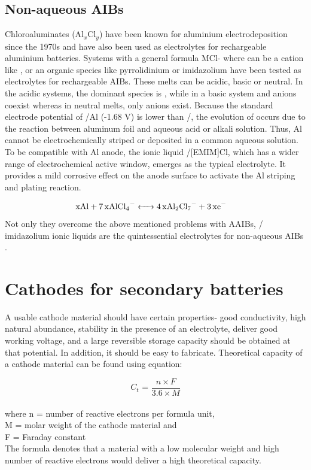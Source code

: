 \subsection{Non-aqueous AIBs}
Chloroaluminates (Al$_x$Cl$_y$) have been known for aluminium electrodeposition since the 1970s and have also been used as electrolytes for rechargeable aluminium batteries\cite{weppner,fung_reac}. Systems with a general formula MCl- where  can be a cation like ,  or an organic species like pyrrolidinium or imidazolium have been tested as electrolytes for rechargeable AIBs\cite{das_aluminium-ion_2017}. These melts can be acidic, basic or neutral. In the acidic systems, the dominant species is , while in a basic system  and  anions coexist whereas in neutral melts, only  anions exist. Because the standard electrode potential of /Al (-1.68 V) is lower than /, the evolution of  occurs due to the reaction between aluminum foil and aqueous acid or alkali solution. Thus, Al cannot be electrochemically striped or deposited in a common aqueous solution. To be compatible with Al anode, the ionic liquid /[EMIM]Cl, which has a wider range of electrochemical active window, emerges as the typical electrolyte. It provides a mild corrosive effect on the anode surface to activate the Al striping and plating reaction. 

\begin{align*}
        \ce{xAl + 7x\ce{AlCl4-} &<-> 4x\ce{Al2Cl7-} + 3x\ce{e-}}
\end{align*}
Not only they overcome the above mentioned problems with AAIBs, / imidazolium ionic liquids are the quintessential electrolytes for non-aqueous AIBs \cite{jayaprakash_rechargeable_2011, lin_ultrafast_2015-3,wang_new_2013-1,rani_fluorinated_2013}. 

\section{Cathodes for secondary batteries}
A usable cathode material should have certain properties- good conductivity, high natural abundance, stability in the presence of an electrolyte, deliver good working voltage, and a large reversible storage capacity should be obtained at that potential. In addition, it should be easy to fabricate. Theoretical capacity of a cathode material can be found using equation:

\begin{equation} \label{eq3}
   C_{t} \text{ = } \frac{n \times F}{3.6 \times M}
\end{equation}\\
where n = number of reactive electrons per formula unit,\\
M = molar weight of the cathode material and\\
F = Faraday constant\\
The formula denotes that a material with a low molecular weight and high number of reactive electrons would deliver a high theoretical capacity.

